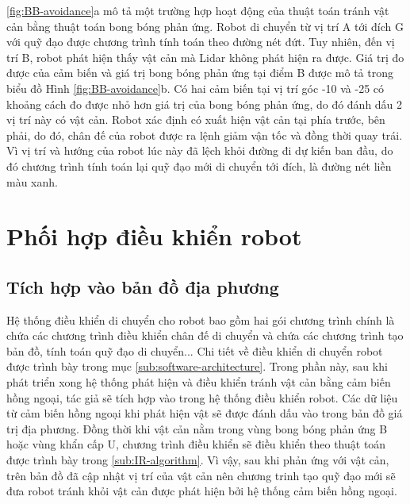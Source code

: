 \figurename{ \ref{fig:BB-avoidance}}a mô tả một trường hợp hoạt động của thuật toán tránh vật cản bằng thuật toán bong bóng phản ứng. Robot di chuyển từ vị trí A tới đích G với quỹ đạo được chương trình  tính toán theo đường nét đứt. Tuy nhiên, đến vị trí B, robot phát hiện thấy vật cản mà Lidar không phát hiện ra được. Giá trị đo được của cảm biến và giá trị bong bóng phản ứng tại điểm B được mô tả trong biểu đồ Hình \ref{fig:BB-avoidance}b. Có hai cảm biến tại vị trí góc -10 và -25 có khoảng cách đo được nhỏ hơn giá trị của bong bóng phản ứng, do đó đánh dấu 2 vị trí này có vật cản. Robot xác định có xuất hiện vật cản tại phía trước, bên phải, do đó, chân đế của robot được ra lệnh giảm vận tốc và đồng thời quay trái. Vì vị trí và hướng của robot lúc này đã lệch khỏi đường đi dự kiến ban đầu, do đó chương trình  tính toán lại quỹ đạo mới di chuyển tới đích, là đường nét liền màu xanh.

\section{Phối hợp điều khiển robot}
\subsection{Tích hợp vào bản đồ địa phương}

Hệ thống điều khiển di chuyển cho robot bao gồm hai gói chương trình chính là  chứa các chương trình điều khiển chân đế di chuyển và  chứa các chương trình tạo bản đồ, tính toán quỹ đạo di chuyển... Chi tiết về điều khiển di chuyển robot được trình bày trong mục \ref{sub:software-architecture}.
Trong phần này, sau khi phát triển xong hệ thống phát hiện và điều khiển tránh vật cản bằng cảm biến hồng ngoại, tác giả sẽ tích hợp vào trong hệ thống điều khiển robot. Các dữ liệu từ cảm biến hồng ngoại khi phát hiện vật sẽ được đánh dấu vào trong bản đồ giá trị địa phương. Đồng thời khi vật cản nằm trong vùng bong bóng phản ứng B hoặc vùng khẩn cấp U, chương trình điều khiển sẽ điều khiển theo thuật toán được trình bày trong \ref{sub:IR-algorithm}. Vì vậy, sau khi phản ứng với vật cản, trên bản đồ đã cập nhật vị trí của vật cản nên chương trinh tạo quỹ đạo mới sẽ đưa robot tránh khỏi vật cản được phát hiện bởi hệ thống cảm biến hồng ngoại.


